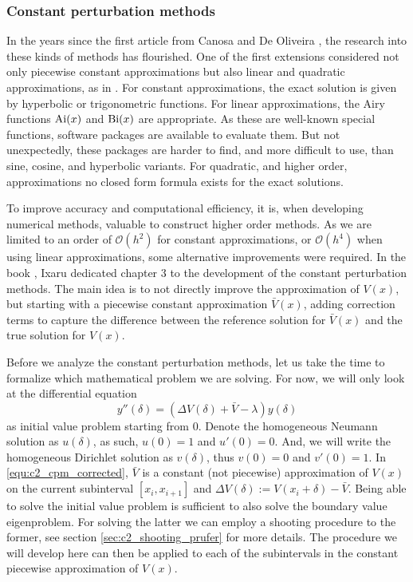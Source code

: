 \subsubsection{Constant perturbation methods}

In the years since the first article from Canosa and De Oliveira \cite{canosa_new_1970}, the research into these kinds of methods has flourished. One of the first extensions considered not only piecewise constant approximations but also linear and quadratic approximations, as in \cite{pruess_estimating_1973}. For constant approximations, the exact solution is given by hyperbolic or trigonometric functions. For linear approximations, the Airy functions $\operatorname{Ai}(x)$ and $\operatorname{Bi}(x)$ are appropriate. As these are well-known special functions, software packages are available to evaluate them. But not unexpectedly, these packages are harder to find, and more difficult to use, than sine, cosine, and hyperbolic variants. For quadratic, and higher order, approximations no closed form formula exists for the exact solutions.

To improve accuracy and computational efficiency, it is, when developing numerical methods, valuable to construct higher order methods. As we are limited to an order of $\mathcal{O}(h^2)$ for constant approximations, or $\mathcal{O}(h^4)$ when using linear approximations, some alternative improvements were required. In the book \cite{ixaru_numerical_1984}, Ixaru dedicated chapter 3 to the development of the constant perturbation methods. The main idea is to not directly improve the approximation of $V(x)$, but starting with a piecewise constant approximation $\bar{V}(x)$, adding correction terms to capture the difference between the reference solution for $\bar{V}(x)$ and the true solution for $V(x)$.

Before we analyze the constant perturbation methods, let us take the time to formalize which mathematical problem we are solving. For now, we will only look at the differential equation
\begin{equation}\label{equ:c2_cpm_corrected}
    y''(\delta) = (\Delta V(\delta) + \bar{V} - \lambda) y(\delta)
\end{equation}
as initial value problem starting from $0$. Denote the homogeneous Neumann solution as $u(\delta)$, as such, $u(0) = 1$ and $u'(0) = 0$. And, we will write the homogeneous Dirichlet solution as $v(\delta)$, thus $v(0) = 0$ and $v'(0)=1$. In \eqref{equ:c2_cpm_corrected}, $\bar{V}$ is a constant (not piecewise) approximation of $V(x)$ on the current subinterval $[x_i, x_{i+1}]$ and $\Delta V(\delta) := V(x_i + \delta) - \bar{V}$. Being able to solve the initial value problem is sufficient to also solve the boundary value eigenproblem. For solving the latter we can employ a shooting procedure to the former, see section \ref{sec:c2_shooting_prufer} for more details. The procedure we will develop here can then be applied to each of the subintervals in the constant piecewise approximation of $V(x)$.

